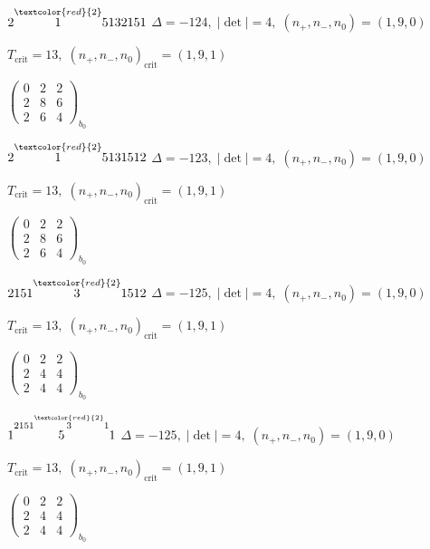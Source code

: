 \documentclass[10pt]{article}
\begin{document}
\smallskip

$2\overset{\textcolor{red}{2}}{1}5132151$ \quad $\Delta=-124,\; |\det|=4,\; (n_+,n_-,n_0)=(1,9,0)$

\hspace{1em}$T_{\text{crit}}=13,\; (n_+,n_-,n_0)_{\text{crit}}=(1,9,1)$

\hspace{2em}$\left(\begin{smallmatrix}0 & 2 & 2 \\ 2 & 8 & 6 \\ 2 & 6 & 4\end{smallmatrix}\right)_{\!b_0}$

\smallskip

$2\overset{\textcolor{red}{2}}{1}5131512$ \quad $\Delta=-123,\; |\det|=4,\; (n_+,n_-,n_0)=(1,9,0)$

\hspace{1em}$T_{\text{crit}}=13,\; (n_+,n_-,n_0)_{\text{crit}}=(1,9,1)$

\hspace{2em}$\left(\begin{smallmatrix}0 & 2 & 2 \\ 2 & 8 & 6 \\ 2 & 6 & 4\end{smallmatrix}\right)_{\!b_0}$

$2151\overset{\textcolor{red}{2}}{3}1512$ \quad $\Delta=-125,\; |\det|=4,\; (n_+,n_-,n_0)=(1,9,0)$

\hspace{1em}$T_{\text{crit}}=13,\; (n_+,n_-,n_0)_{\text{crit}}=(1,9,1)$

\hspace{2em}$\left(\begin{smallmatrix}0 & 2 & 2 \\ 2 & 4 & 4 \\ 2 & 4 & 4\end{smallmatrix}\right)_{\!b_0}$

\smallskip

$1\overset{2151\overset{\textcolor{red}{2}}{3}1}{5}1$ \quad $\Delta=-125,\; |\det|=4,\; (n_+,n_-,n_0)=(1,9,0)$

\hspace{1em}$T_{\text{crit}}=13,\; (n_+,n_-,n_0)_{\text{crit}}=(1,9,1)$

\hspace{2em}$\left(\begin{smallmatrix}0 & 2 & 2 \\ 2 & 4 & 4 \\ 2 & 4 & 4\end{smallmatrix}\right)_{\!b_0}$
\end{document}
